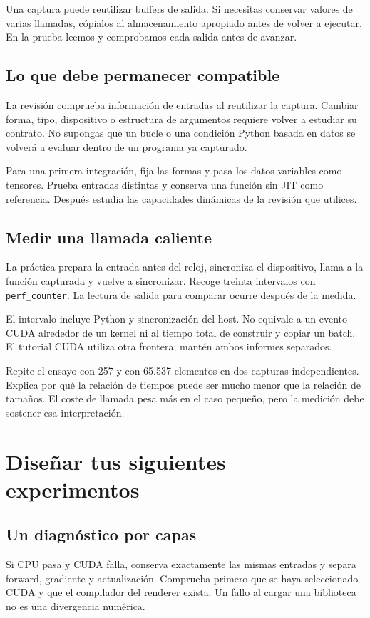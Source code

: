 \documentclass[12pt,a4paper,oneside]{report}
\begin{document}
Una captura puede reutilizar buffers de salida. Si necesitas conservar valores de varias llamadas, cópialos al almacenamiento apropiado antes de volver a ejecutar. En la prueba leemos y comprobamos cada salida antes de avanzar.

\section{Lo que debe permanecer compatible}
La revisión comprueba información de entradas al reutilizar la captura. Cambiar forma, tipo, dispositivo o estructura de argumentos requiere volver a estudiar su contrato. No supongas que un bucle o una condición Python basada en datos se volverá a evaluar dentro de un programa ya capturado.

Para una primera integración, fija las formas y pasa los datos variables como tensores. Prueba entradas distintas y conserva una función sin JIT como referencia. Después estudia las capacidades dinámicas de la revisión que utilices.

\section{Medir una llamada caliente}
La práctica prepara la entrada antes del reloj, sincroniza el dispositivo, llama a la función capturada y vuelve a sincronizar. Recoge treinta intervalos con \texttt{perf\_counter}. La lectura de salida para comparar ocurre después de la medida.

El intervalo incluye Python y sincronización del host. No equivale a un evento CUDA alrededor de un kernel ni al tiempo total de construir y copiar un batch. El tutorial CUDA utiliza otra frontera; mantén ambos informes separados.

\begin{practica}
Repite el ensayo con 257 y con 65.537 elementos en dos capturas independientes. Explica por qué la relación de tiempos puede ser mucho menor que la relación de tamaños. El coste de llamada pesa más en el caso pequeño, pero la medición debe sostener esa interpretación.

\end{practica}
\chapter{Diseñar tus siguientes experimentos}
\section{Un diagnóstico por capas}
Si CPU pasa y CUDA falla, conserva exactamente las mismas entradas y separa forward, gradiente y actualización. Comprueba primero que se haya seleccionado CUDA y que el compilador del renderer exista. Un fallo al cargar una biblioteca no es una divergencia numérica.
\end{document}
